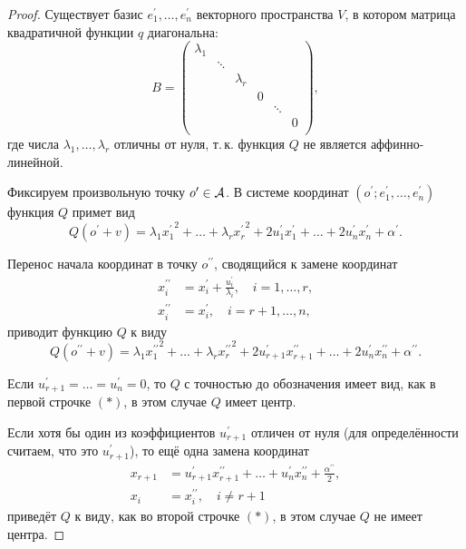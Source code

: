 \begin{proof}
    Существует базис $e_1^\prime, \ldots, e_n^\prime$ векторного пространства $V$, в котором матрица квадратичной функции $q$ диагональна:
    \[
        B =
        \begin{pmatrix}
            \lambda_1 &  &  &  &  &  \\
              & \ddots &  &  &  & \\
              &  & \lambda_r &  &  & \\
              &  &  & 0 &  & \\
              &  &  &  & \ddots & \\
              &  &  &  & & 0\\
        \end{pmatrix},
    \]
    где числа $\lambda_1, \ldots, \lambda_r$ отличны от нуля, т.\,к. функция $Q$ не является аффинно-линейной.

    Фиксируем произвольную точку $o^\prime \in \mathcal{A}$. В системе координат $(o^\prime; e_1^\prime, \ldots, e_n^\prime)$ функция $Q$ примет вид
    \[
        Q(o^\prime + v) = \lambda_1{x_1^\prime}^2 + \ldots + \lambda_r{x_r^\prime}^2 + 2u_1^\prime x_1^\prime + \ldots + 2u_n^\prime x_n^\prime + \alpha^\prime.
    \]

    Перенос начала координат в точку $o^{\prime\prime}$, сводящийся к замене координат
    \begin{align*}
        x_i^{\prime\prime} &= x_i^\prime + \frac{u_i^\prime}{\lambda_i},\quad i = 1, \ldots, r,\\
        x_i^{\prime\prime} &= x_i^\prime,\quad i = r + 1, \ldots, n,
    \end{align*}
    приводит функцию $Q$ к виду
    \[
        Q(o^{\prime\prime} + v) = \lambda_1{x_1^{\prime\prime}}^2 + \ldots + \lambda_r{x_r^{\prime\prime}}^2 + 2u_{r + 1}^\prime x_{r + 1}^{\prime\prime} + \ldots + 2u_n^\prime x_n^{\prime\prime} + \alpha^{\prime\prime}.
    \]

    Если $u^\prime_{r + 1} = \ldots = u_n^\prime = 0$, то $Q$ с точностью до обозначения имеет вид, как в первой строчке $(\ast)$, в этом случае $Q$ имеет центр.

    Если хотя бы один из коэффициентов $u_{r + 1}^\prime$ отличен от нуля (для определённости считаем, что это $u_{r + 1}^\prime$), то ещё одна замена координат
    \begin{align*}
        x_{r + 1} &= u^\prime_{r + 1}x_{r + 1}^{\prime\prime} + \ldots + u_n^\prime x_n^{\prime\prime} + \frac{\alpha^{\prime\prime}}{2},\\
        x_i &= x_i^{\prime\prime},\quad i \ne r + 1
    \end{align*}
    приведёт $Q$ к виду, как во второй строчке $(\ast)$, в этом случае $Q$ не имеет центра.
\end{proof}

